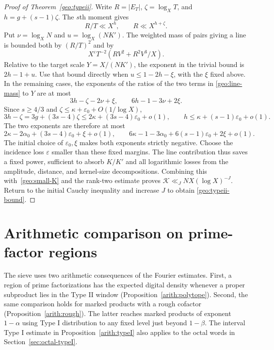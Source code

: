 \documentclass[11pt,a4paper]{article}
\theoremstyle{paperplain}
\numberwithin{equation}{section}
\begin{document}
\begin{proof}[Proof of Theorem~\ref{geo:typeii}]
Write $R=|E_T|$, $\zeta=\log_XT$, and $h=g+(s-1)\zeta$.
The $s$th moment gives
\[
 R/T\ll X^h,\qquad R\ll X^{h+\zeta}.
\]
Put $\nu=\log_XN$ and $u=\log_X(NK')$.
The weighted mass of pairs giving a line is bounded both by $(R/T)^2$ and by
\begin{equation}\label{geo:line-mass}
 X^\varepsilon T^{-2}\left(RV^2+R^2V^3/X\right).
\end{equation}
Relative to the target scale $Y=X/(NK')$, the exponent in the trivial bound is
$2h-1+u$.
Use that bound directly when $u\le1-2h-\xi$, with the $\xi$ fixed above.
In the remaining cases, the exponents of the ratios of the two terms in
\eqref{geo:line-mass} to $Y$ are at most
\[
 3h-\zeta-2\nu+\xi,\qquad 6h-1-3\nu+2\xi.
\]
Since $s\ge4/3$ and
$\zeta\le\kappa+\varepsilon_0+O(1/\log X)$,
\[
 3h-\zeta=3g+(3s-4)\zeta
 \le2\kappa+(3s-4)\varepsilon_0+o(1),\qquad
 h\le\kappa+(s-1)\varepsilon_0+o(1).
\]
The two exponents are therefore at most
\begin{equation}\label{geo:line-powers}
 2\kappa-2\alpha_0+(3s-4)\varepsilon_0+\xi+o(1),\qquad
 6\kappa-1-3\alpha_0+6(s-1)\varepsilon_0+2\xi+o(1).
\end{equation}
The initial choice of $\varepsilon_0,\xi$ makes both exponents strictly
negative. Choose the incidence loss $\varepsilon$ smaller than these
fixed margins.
The line contribution thus saves a fixed power, sufficient to absorb
$K/K'$ and all logarithmic losses from the amplitude, distance, and kernel-size
decompositions.
Combining this with~\eqref{geo:small-K} and the rank-two estimate proves
$\mathcal K\ll_JNX(\log X)^{-J}$.
Return to the initial Cauchy inequality and increase $J$ to obtain
\eqref{geo:typeii-bound}.
\end{proof}


\section{Arithmetic comparison on prime-factor regions}\label{arith:section}

The sieve uses two arithmetic consequences of the Fourier estimates.
First, a region of prime factorizations has the expected digital density
whenever a proper subproduct lies in the Type II window
(Proposition~\ref{arith:polytope}). Second, the same comparison holds for
marked products with a rough cofactor (Proposition~\ref{arith:rough}).
The latter reaches marked products of exponent $1-\alpha$ using
Type I distribution to any fixed level just beyond $1-\beta$.
The interval Type I estimate in Proposition~\ref{arith:typeI} also
applies to the octal words in Section~\ref{sec:octal-typeI}.
\end{document}
